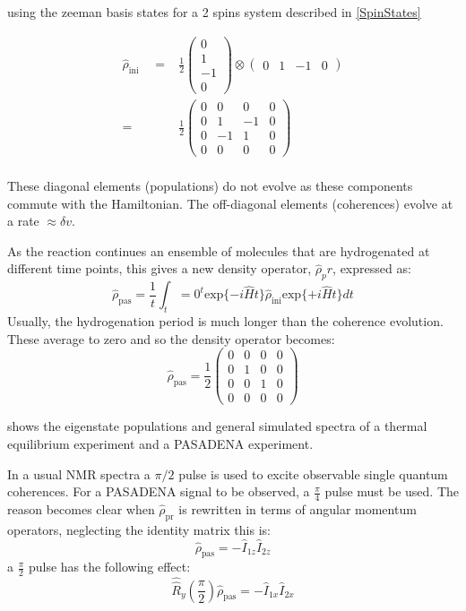  using the zeeman basis states for a 2 spins system described in \ref{SpinStates}

 \begin{align}
   \hat{\rho}_{\text{ini}}\quad=& \frac{1}{2} \begin{pmatrix}
   0\\
   1\\
   -1\\
   0
   \end{pmatrix} \otimes \begin{pmatrix}
     0 & 1 & -1 & 0
     \end{pmatrix}\\
   =& \frac{1}{2}\begin{pmatrix}
   0 & 0 & 0 & 0\\
   0 & 1 & -1 & 0\\
   0 & -1 & 1 & 0\\
   0 & 0 & 0 & 0
 \end{pmatrix} \\
 \end{align}

 These diagonal elements (populations) do not evolve as these components commute with the Hamiltonian. The off-diagonal
 elements (coherences) evolve at a rate $\approx\delta{v}$.

 As the reaction continues an ensemble of molecules that are hydrogenated at different time points, this gives
 a new density operator, $\hat{\rho}_pr$, expressed as:
 \begin{equation}
   \hat{\rho}_{\text{pas}} = \frac{1}{t} \int_t=0^t{\text{exp}\{-i\hat{H}t\}\hat{\rho}_{\text{ini}}\text{exp}\{+i\hat{H}t\}}dt
 \end{equation}
 Usually, the hydrogenation period is much longer than the coherence evolution. These average to zero and so the
 density operator becomes:
 \begin{equation}
   \hat{\rho}_{\text{pas}} = \frac{1}{2}\begin{pmatrix}
   0 & 0 & 0 & 0\\
   0 & 1 & 0 & 0\\
   0 & 0 & 1 & 0\\
   0 & 0 & 0 & 0
 \end{pmatrix}
 \end{equation}

  shows the eigenstate populations and general simulated spectra of a thermal equilibrium experiment and
 a PASADENA experiment.

 In a usual NMR spectra a $\pi/2$ pulse is used to excite observable single quantum coherences. For a PASADENA signal to
 be observed, a $\frac{\pi}{4}$ pulse must be used. The reason becomes clear when $\hat{\rho}_{\text{pr}}$ is rewritten
 in terms of angular momentum operators, neglecting the identity matrix this is:
 \begin{equation}
   \hat{\rho}_{\text{pas}} = -\hat{I}_{1z}\hat{I}_{2z}
 \end{equation}
 a $\frac{\pi}{2}$ pulse has the following effect:
 \begin{equation}
   \hat{\hat{R}}_y(\frac{\pi}{2})\hat{\rho}_{\text{pas}} = -\hat{I}_{1x}\hat{I}_{2x}
 \end{equation}

